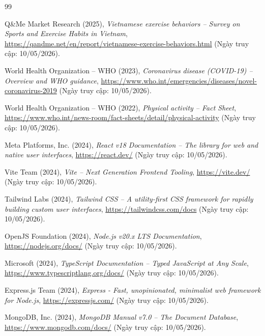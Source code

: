 \begin{thebibliography}{99}
\small
\setlength{\itemsep}{3pt}
\setlength{\parsep}{0pt}
\setlength{\parskip}{0pt}

Q\&Me Market Research (2025), \textit{Vietnamese exercise behaviors -- Survey on Sports and Exercise Habits in Vietnam}, \url{https://qandme.net/en/report/vietnamese-exercise-behaviors.html} (Ngày truy cập: 10/05/2026).

World Health Organization -- WHO (2023), \textit{Coronavirus disease (COVID-19) -- Overview and WHO guidance}, \url{https://www.who.int/emergencies/diseases/novel-coronavirus-2019} (Ngày truy cập: 10/05/2026).

World Health Organization -- WHO (2022), \textit{Physical activity -- Fact Sheet}, \url{https://www.who.int/news-room/fact-sheets/detail/physical-activity} (Ngày truy cập: 10/05/2026).

Meta Platforms, Inc. (2024), \textit{React v18 Documentation -- The library for web and native user interfaces}, \url{https://react.dev/} (Ngày truy cập: 10/05/2026).

Vite Team (2024), \textit{Vite -- Next Generation Frontend Tooling}, \url{https://vite.dev/} (Ngày truy cập: 10/05/2026).

Tailwind Labs (2024), \textit{Tailwind CSS -- A utility-first CSS framework for rapidly building custom user interfaces}, \url{https://tailwindcss.com/docs} (Ngày truy cập: 10/05/2026).

OpenJS Foundation (2024), \textit{Node.js v20.x LTS Documentation}, \url{https://nodejs.org/docs/} (Ngày truy cập: 10/05/2026).

Microsoft (2024), \textit{TypeScript Documentation -- Typed JavaScript at Any Scale}, \url{https://www.typescriptlang.org/docs/} (Ngày truy cập: 10/05/2026).

Express.js Team (2024), \textit{Express - Fast, unopinionated, minimalist web framework for Node.js}, \url{https://expressjs.com/} (Ngày truy cập: 10/05/2026).

MongoDB, Inc. (2024), \textit{MongoDB Manual v7.0 -- The Document Database}, \url{https://www.mongodb.com/docs/} (Ngày truy cập: 10/05/2026).


\end{thebibliography}
